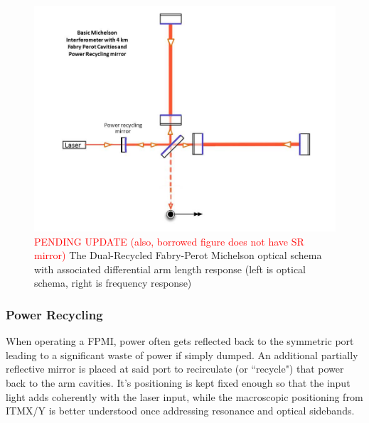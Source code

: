 \begin{figure}[H]
\begin{center}
\includegraphics[width=\textwidth]{figs/INTRO/tempsub_Basic_michelson_with_FP_and_PR_labeled.jpg}
\end{center}
\caption{\textcolor{red}{PENDING UPDATE (also, borrowed figure does not have SR mirror)} The Dual-Recycled Fabry-Perot Michelson optical schema with associated differential arm length response (left is optical schema, right is frequency response)}
\label{fig:drfp_michelson}
\end{figure}


\subsubsection{Power Recycling}
When operating a FPMI, power often gets reflected back to the symmetric port leading to a significant waste of power if simply dumped. An additional partially reflective mirror is placed at said port to recirculate (or ``recycle") that power back to the arm cavities. It's positioning is kept fixed enough so that the input light adds coherently with the laser input, while the macroscopic positioning from ITMX/Y is better understood once addressing resonance and optical sidebands.

